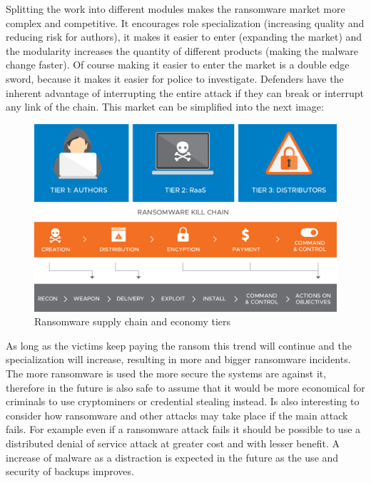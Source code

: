 \linej
Splitting the work into different modules makes the ransomware market more complex and competitive.
It encourages role specialization (increasing quality and reducing risk for authors), it makes it easier to enter (expanding the market) and the modularity increases the quantity of different products (making the malware change faster).
\linej
Of course making it easier to enter the market is a double edge sword, because it makes it easier for police to investigate.
Defenders have the inherent advantage of interrupting the entire attack if they can break or interrupt any link of the chain.
\linej
This market can be simplified into the next image:
\begin{figure}[H]
	\centering
	\includegraphics[width=\textwidth]{figuras/ransomware_chain.png}
	\caption{Ransomware supply chain and economy tiers\cite{ransomware_economy}}
\end{figure}
\linej
As long as the victims keep paying the ransom this trend will continue and the specialization will increase, resulting in more and bigger ransomware incidents.
The more ransomware is used the more secure the systems are against it, therefore in the future is also safe to assume that it would be more economical for criminals to use cryptominers or credential stealing instead\cite{ransomware_malwarebytes}.
\linej
\linej
Is also interesting to consider how ransomware and other attacks may take place if the main attack fails.
For example even if a ransomware attack fails it should be possible to use a distributed denial of service attack at greater cost and with lesser benefit.
A increase of malware as a distraction is expected in the future as the use and security of backups improves\cite{ransomware_economy}.

